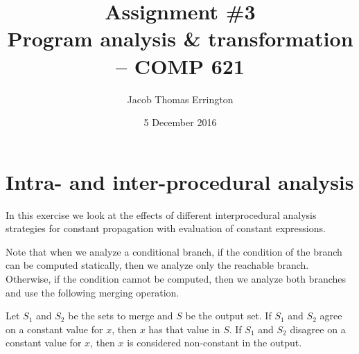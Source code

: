 \documentclass[letterpaper,11pt]{article}
\author{Jacob Thomas Errington}
\title{Assignment \#3\\Program analysis \& transformation -- COMP 621}
\date{5 December 2016}
\begin{document}
\maketitle

\section{Intra- and inter-procedural analysis}

In this exercise we look at the effects of different interprocedural analysis
strategies for constant propagation with evaluation of constant expressions.

Note that when we analyze a conditional branch, if the condition of the
branch can be computed statically, then we analyze only the reachable
branch. Otherwise, if the condition cannot be computed, then we analyze
both branches and use the following merging operation.

\begin{displayquote}
  Let $S_1$ and $S_2$ be the sets to merge and $S$ be the output set. If
  $S_1$ and $S_2$ agree on a constant value for $x$, then $x$ has that
  value in $S$. If $S_1$ and $S_2$ disagree on a constant value for $x$,
  then $x$ is considered non-constant in the output.
\end{displayquote}
\end{document}
